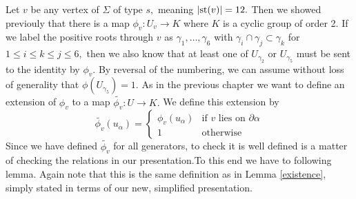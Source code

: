\documentclass[class=book, crop=false]{standalone}
\begin{document}
Let $v$ be any vertex of $\Sigma$ of type $s,$ meaning $|\mathrm{st}(v)|=12.$ Then we showed previouly that there is a map $\phi_v:U_v\to K$ where $K$ is a cyclic group of order 2. If we label the positive roots through $v$ as  $\gamma_1,\dots,\gamma_6$ with $\gamma_i\cap \gamma_j\subset \gamma_k$ for $1\le i\le k\le j\le 6,$ then we also know that at least one of $U_{\gamma_2}$ or $U_{\gamma_5}$ must be sent to the identity by $\phi_v.$ By reversal of the numbering, we can assume without loss of generality that $\phi(U_{\gamma_5})=1.$ As in the previous chapter we want to define an extension of $\phi_v$ to a map $\tilde{\phi_v}:U\to K.$ We define this extension by
\[
	\tilde{\phi_v}(u_\alpha)=\begin{cases}\phi_v(u_\alpha)&\text{if }v\text{ lies on }\partial\alpha\\1&\text{otherwise}
	\end{cases}
	\]
	Since we have defined $\tilde{\phi_v}$ for all generators, to check it is well defined is a matter of checking the relations in our presentation.To this end we have to following lemma. Again note that this is the same definition as in Lemma \ref{existence}, simply stated in terms of our new, simplified presentation.
\end{document}
